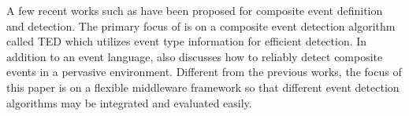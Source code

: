 A few recent works such as \cite{lai:ted, complexevent} have been proposed for composite event definition and detection. The primary focus of \cite{lai:ted} is on a composite event detection algorithm called TED which utilizes event type information for efficient detection. In addition to an event language, \cite{complexevent} also discusses how to reliably detect composite events in a pervasive environment. Different from the previous works, the focus of this paper is on a flexible middleware framework so that different event detection algorithms may be integrated and evaluated easily.

\begin{comment}
\subsection{Composite Event Detection}
If we take the event relations into consideration while detecting the events, then detection can be done with different strategies. In this paper, we mainly consider message cost as event detection cost. Furthermore, since primitive event can be detected by individual sensor nodes, we mainly consider the composite event detection cost in this paper.

In general, if a composite event is detected based on two sub-events \(e_1\) and \(e_2\) as shown in Figure \ref{fig:event-detection2} then the cost for detecting the composite event will be the cost for detecting each individual events together with the cost for delivering the event detection results to the event detector. An event detector here is simply a node responsible for detecting composite events.

\begin{figure}
\centering
\subfloat[Basic composite event detection]{\label{fig:event-detection2}\figurehalfwidth{event-detection2}}
\subfloat[Composite event detection using event probability]{\label{fig:event-detection3}\figurehalfwidth{event-detection3}}
\caption{Composite event detection}
\label{fig:event-detection}
\end{figure}

Sometimes the events may have dependency and certain events must happen before others. In this case, we don't need to make all sensor nodes monitor the events at all the time. Instead, some nodes may firstly put to sleep mode and then be waken up when other events occur. For example, as shown in Figure \ref{fig:event-detection3}, if we have two events \(e_1\) and \(e_2\) which have a relation such that the composite event happens only when both events have been successfully detected. If \(e_2\) and \(e_1\) need to satisfy a relation such that \(e_2\) happens after \(e_1\). Then originally the nodes responsible for monitoring \(e_2\) may be put to sleep mode. After \(e_1\) has successfully been detected, a message can be forwarded to the nodes responsible for detecting \(e_2\) and wake them up. In this way, we can further reduce the energy cost because \(e_2\) doesn't have to be monitored if \(e_1\) doesn't occur.
\end{comment}

